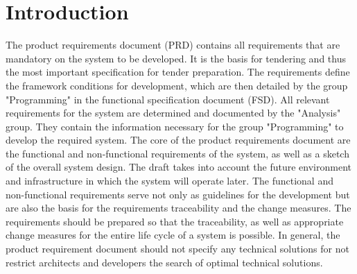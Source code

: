 \chapter{Introduction}
The product requirements document (PRD) contains all requirements that are mandatory on the system to be developed. 
It is the basis for tendering and thus the most important specification for tender preparation. 
The requirements define the framework conditions for development, which are then detailed by the group "Programming" in the functional specification document (FSD).
All relevant requirements for the system are determined and documented by the "Analysis" group. 
They contain the information necessary for the group "Programming" to develop the required system. 
The core of the product requirements document are the functional and non-functional requirements of the system, as well as a sketch of the overall system design. 
The draft takes into account the future environment and infrastructure in which the system will operate later.
The functional and non-functional requirements serve not only as guidelines for the development but are also the basis for the requirements traceability and the change measures. 
The requirements should be prepared so that the traceability, as well as appropriate change measures for the entire life cycle of a system is possible. 
In general, the product requirement document should not specify any technical solutions for not restrict architects and developers the search of optimal technical solutions.


